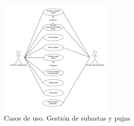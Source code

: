 \begin{figure}[H]
    \centering
    \includegraphics[width=0.5\textwidth]{figures/6-Analisis/6-Casos-uso/6_3_4_Gestion-subastas-pujas.png}
    \caption{Casos de uso. Gestión de subastas y pujas}
    \label{fig:cu_gestion-subastas-pujas}
\end{figure}

